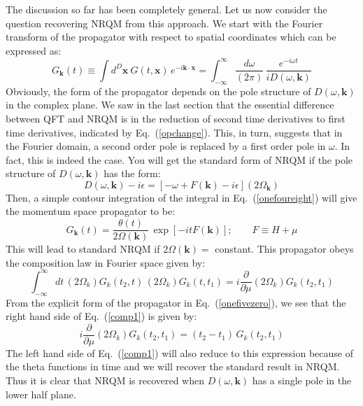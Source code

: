 \documentclass[12pt]{article}
\def\eq#1{{Eq.~(\ref{#1})}}
\begin{document}
The discussion so far has been completely general. Let us now consider the question recovering NRQM from this approach. We start with the Fourier transform of the propagator with respect to spatial coordinates which can be expressed as:
\begin{equation}
 G_{\bm{k}} (t) \equiv \int d^D \bm{x}\ G(t,\bm{x})\, e^{-i\bm{k\cdot x}} = \int_{-\infty}^\infty \frac{d\omega}{(2\pi)} \, \frac{e^{-i\omega t}}{iD(\omega, \bm{k})} 
 \label{onefoureight}
\end{equation}
Obviously, the form of the propagator depends on the pole structure of $D(\omega, \bm{k})$ in the complex plane. We saw in the last section that the essential difference between QFT and NRQM is in the reduction of second time derivatives to first time derivatives, indicated by \eq{opchange}. This, in turn, suggests that in the Fourier domain, a second order pole is replaced by a first order pole in $\omega$. In fact,  
this is indeed the case.
You will get the standard form of NRQM if the pole structure of $D(\omega, \bm{k})$ has the form:
\begin{equation}
 D(\omega, \bm{k} ) - i \epsilon = \left[ - \omega + F(\bm{k}) - i \epsilon\right] (2\Omega_{\bm{k}})
\end{equation}
Then, a simple contour integration of the integral in \eq{onefoureight} will give the momentum space propagator to be:
\begin{equation}
G_{\bm{k}} (t) = \frac{\theta(t)}{2\Omega(\bm{k})} \, \exp\left[ - i t F(\bm{k})\right]; \qquad F\equiv H + \mu 
\label{onefivezero}
\end{equation} 
This will lead to standard NRQM if $2 \Omega(\bm{k})=$ constant. This propagator obeys  the composition law in Fourier space given by:
\begin{equation}
 \int_{-\infty}^\infty dt\, (2\Omega_k) G_k(t_2,t) \, (2\Omega_k) G_k(t,t_1) = i \frac{\partial}{\partial \mu} (2\Omega_k) G_k(t_2,t_1)
 \label{comp1}
\end{equation} 
From the explicit form of the propagator in \eq{onefivezero}, we see that the right hand side of \eq{comp1} is given by:
\begin{equation}
  i \frac{\partial}{\partial \mu} (2\Omega_k) G_k(t_2,t_1) = (t_2-t_1)\, G_k(t_2,t_1)
\end{equation} 
The left hand side of \eq{comp1} will also reduce to this expression because of the theta functions in time and we will recover the standard result in NRQM.  
Thus it is clear that NRQM is recovered when $D(\omega, \bm{k})$ has a single pole in the lower half plane. 
\end{document}
